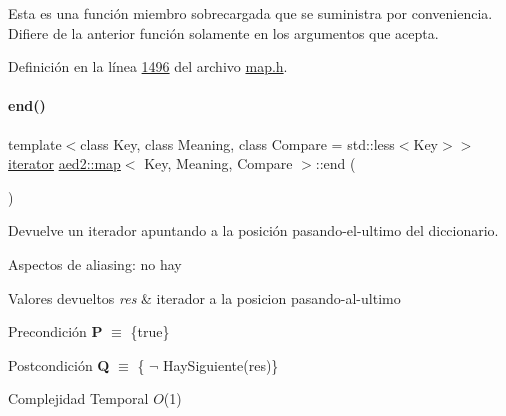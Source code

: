 Esta es una función miembro sobrecargada que se suministra por conveniencia. Difiere de la anterior función solamente en los argumentos que acepta. 

Definición en la línea \hyperlink{map_8h_source_l01496}{1496} del archivo \hyperlink{map_8h_source}{map.\+h}.

\mbox{\label{classaed2_1_1map_a76023e6a56cb625513e1b5ea028bf983_a76023e6a56cb625513e1b5ea028bf983}} 
\paragraph{\texorpdfstring{end()}{end()}\hspace{0.1cm}{\footnotesize\ttfamily [1/2]}}
{\footnotesize\ttfamily template$<$class Key, class Meaning, class Compare = std\+::less$<$\+Key$>$$>$ \\
\hyperlink{classaed2_1_1map_1_1iterator}{iterator} \hyperlink{classaed2_1_1map}{aed2\+::map}$<$ Key, Meaning, Compare $>$\+::end (\begin{DoxyParamCaption}{ }\end{DoxyParamCaption})\hspace{0.3cm}{\ttfamily [inline]}}



Devuelve un iterador apuntando a la posición pasando-\/el-\/ultimo del diccionario. 

\begin{DoxyParagraph}{Aspectos de aliasing\+:}
no hay
\end{DoxyParagraph}

\begin{DoxyRetVals}{Valores devueltos}
{\em res} & iterador a la posicion pasando-\/al-\/ultimo\\
\hline
\end{DoxyRetVals}
\begin{DoxyPrecond}{Precondición}
{\bfseries P} $\equiv$ \{true\} 
\end{DoxyPrecond}
\begin{DoxyPostcond}{Postcondición}
{\bfseries Q} $\equiv$ \{ $\lnot$ Hay\+Siguiente(res)\}
\end{DoxyPostcond}

\begin{DoxyDescription}
\item[Complejidad Temporal]$O$(1)
\end{DoxyDescription}

